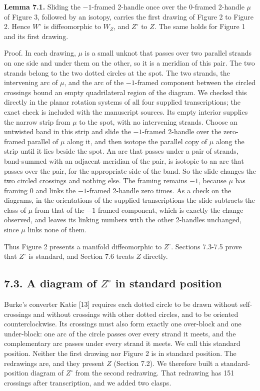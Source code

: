 \documentclass[11pt,letterpaper]{article}
\begin{document}
\medskip\noindent\textbf{Lemma 7.1.} Sliding the $-1$-framed 2-handle once over the $0$-framed 2-handle $\mu$ of Figure 3, followed by an isotopy, carries the first drawing of Figure 2 to Figure 2. Hence $W^\circ$ is diffeomorphic to $W_Z$, and $Z^\circ$ to $Z$. The same holds for Figure 1 and its first drawing.

Proof. In each drawing, $\mu$ is a small unknot that passes over two parallel strands on one side and under them on the other, so it is a meridian of this pair. The two strands belong to the two dotted circles at the spot. The two strands, the intervening arc of $\mu$, and the arc of the $-1$-framed component between the circled crossings bound an empty quadrilateral region of the diagram. We checked this directly in the planar rotation systems of all four supplied transcriptions; the exact check is included with the manuscript sources. Its empty interior supplies the narrow strip from $\mu$ to the spot, with no intervening strands. Choose an untwisted band in this strip and slide the $-1$-framed 2-handle over the zero-framed parallel of $\mu$ along it, and then isotope the parallel copy of $\mu$ along the strip until it lies beside the spot. An arc that passes under a pair of strands, band-summed with an adjacent meridian of the pair, is isotopic to an arc that passes over the pair, for the appropriate side of the band. So the slide changes the two circled crossings and nothing else. The framing remains $-1$, because $\mu$ has framing $0$ and links the $-1$-framed 2-handle zero times. As a check on the diagrams, in the orientations of the supplied transcriptions the slide subtracts the class of $\mu$ from that of the $-1$-framed component, which is exactly the change observed, and leaves its linking numbers with the other 2-handles unchanged, since $\mu$ links none of them.

Thus Figure 2 presents a manifold diffeomorphic to $Z^\circ$. Sections 7.3-7.5 prove that $Z^\circ$ is standard, and Section 7.6 treats $Z$ directly.

\subsection*{7.3. A diagram of $Z^\circ$ in standard position}
Burke's converter Katie [13] requires each dotted circle to be drawn without self-crossings and without crossings with other dotted circles, and to be oriented counterclockwise. Its crossings must also form exactly one over-block and one under-block: one arc of the circle passes over every strand it meets, and the complementary arc passes under every strand it meets. We call this standard position. Neither the first drawing nor Figure 2 is in standard position. The redrawings are, and they present $Z$ (Section 7.2). We therefore built a standard-position diagram of $Z^\circ$ from the second redrawing. That redrawing has 151 crossings after transcription, and we added two clasps.
\end{document}
